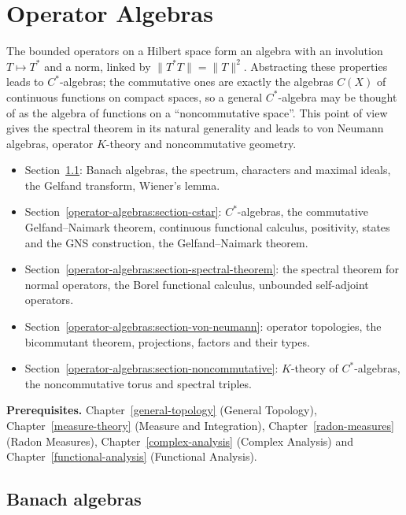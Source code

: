 \chapter{Operator Algebras}\label{operator-algebras}

The bounded operators on a Hilbert space form an algebra with an involution $T \mapsto T^*$ and a norm, linked by $\|T^*T\| = \|T\|^2$. Abstracting these properties leads to $C^*$-algebras; the commutative ones are
exactly the algebras $C(X)$ of continuous functions on compact spaces, so a general $C^*$-algebra may be thought of as the algebra of functions on a ``noncommutative space''. This point of view gives the spectral
theorem in its natural generality and leads to von Neumann algebras, operator $K$-theory and noncommutative geometry.
\begin{itemize}
\item Section~\ref{operator-algebras:section-banach-algebras}: Banach algebras, the spectrum, characters and maximal ideals, the Gelfand transform, Wiener's lemma.
\item Section~\ref{operator-algebras:section-cstar}: $C^*$-algebras, the commutative Gelfand--Naimark theorem, continuous functional calculus, positivity, states and the GNS construction, the Gelfand--Naimark theorem.
\item Section~\ref{operator-algebras:section-spectral-theorem}: the spectral theorem for normal operators, the Borel functional calculus, unbounded self-adjoint operators.
\item Section~\ref{operator-algebras:section-von-neumann}: operator topologies, the bicommutant theorem, projections, factors and their types.
\item Section~\ref{operator-algebras:section-noncommutative}: $K$-theory of $C^*$-algebras, the noncommutative torus and spectral triples.
\end{itemize}

\noindent\textbf{Prerequisites.} Chapter~\ref{general-topology} (General Topology), Chapter~\ref{measure-theory} (Measure and Integration), Chapter~\ref{radon-measures} (Radon Measures), Chapter~\ref{complex-analysis} (Complex
Analysis) and Chapter~\ref{functional-analysis} (Functional Analysis).

\section{Banach algebras}\label{operator-algebras:section-banach-algebras}

